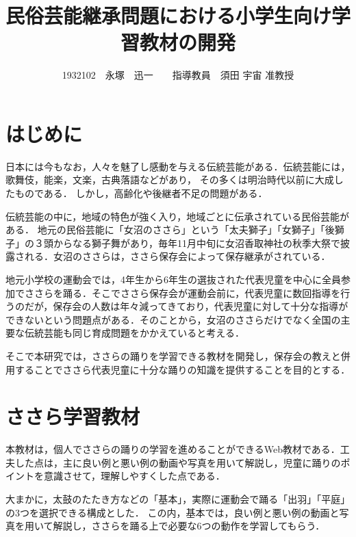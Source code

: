 \documentclass[twocolumn,10pt,a4j]{ltjsarticle}
\title{民俗芸能継承問題における小学生向け学習教材の開発}
\author{1932102　永塚　迅一　　指導教員　須田 宇宙 准教授}
\date{}
\begin{document}
\maketitle
\section{はじめに}

日本には今もなお，人々を魅了し感動を与える伝統芸能がある．伝統芸能には，歌舞伎，能楽，文楽，古典落語などがあり，
その多くは明治時代以前に大成したものである．
しかし，高齢化や後継者不足の問題がある．

伝統芸能の中に，地域の特色が強く入り，地域ごとに伝承されている民俗芸能がある．
地元の民俗芸能に「女沼のささら」という「太夫獅子」「女獅子」「後獅子」の３頭からなる獅子舞があり，毎年11月中旬に女沼香取神社の秋季大祭で披露される\cite{suda2018}．女沼のささらは，ささら保存会によって保存継承がされている．


地元小学校の運動会では，4年生から6年生の選抜された代表児童を中心に全員参加でささらを踊る．そこでささら保存会が運動会前に，代表児童に数回指導を行うのだが，保存会の人数は年々減ってきており，代表児童に対して十分な指導ができないという問題点がある．そのことから，女沼のささらだけでなく全国の主要な伝統芸能も同じ育成問題をかかえていると考える．

そこで本研究では，ささらの踊りを学習できる教材を開発し，保存会の教えと併用することでささら代表児童に十分な踊りの知識を提供することを目的とする．

\section{ささら学習教材}
本教材は，個人でささらの踊りの学習を進めることができるWeb教材である．工夫した点は，主に良い例と悪い例の動画や写真を用いて解説し，児童に踊りのポイントを意識させて，理解しやすくした点である．

大まかに，太鼓のたたき方などの「基本」，実際に運動会で踊る「出羽」「平庭」の3つを選択できる構成とした．
この内，基本では，良い例と悪い例の動画と写真を用いて解説し，ささらを踊る上で必要な6つの動作を学習してもらう．
\end{document}
